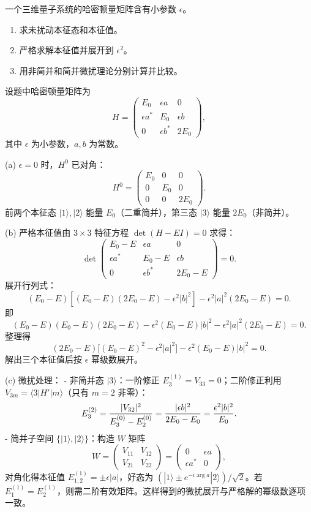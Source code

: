\begin{question}
一个三维量子系统的哈密顿量矩阵含有小参数 $\epsilon$。
\begin{enumerate}
\item 求未扰动本征态和本征值。
\item 严格求解本征值并展开到 $\epsilon^2$。
\item 用非简并和简并微扰理论分别计算并比较。
\end{enumerate}
\end{question}
\begin{solution}
设题中哈密顿量矩阵为
\[
H=\begin{pmatrix}
E_0 & \epsilon a & 0\\
\epsilon a^* & E_0 & \epsilon b\\
0 & \epsilon b^* & 2E_0
\end{pmatrix},
\]
其中 $\epsilon$ 为小参数，$a,b$ 为常数。

(a) $\epsilon=0$ 时，$H^0$ 已对角：
\[
H^0=\begin{pmatrix}
E_0 & 0 & 0\\
0 & E_0 & 0\\
0 & 0 & 2E_0
\end{pmatrix}.
\]
前两个本征态 $|1\rangle,|2\rangle$ 能量 $E_0$（二重简并），第三态 $|3\rangle$ 能量 $2E_0$（非简并）。

(b) 严格本征值由 $3\times3$ 特征方程 $\det(H-EI)=0$ 求得：
\[
\det\begin{pmatrix}
E_0-E & \epsilon a & 0\\
\epsilon a^* & E_0-E & \epsilon b\\
0 & \epsilon b^* & 2E_0-E
\end{pmatrix}=0.
\]
展开行列式：
\[
(E_0-E)[(E_0-E)(2E_0-E)-\epsilon^2|b|^2]-\epsilon^2|a|^2(2E_0-E)=0.
\]
即
\[
(E_0-E)(E_0-E)(2E_0-E)-\epsilon^2(E_0-E)|b|^2-\epsilon^2|a|^2(2E_0-E)=0.
\]
整理得
\[
(2E_0-E)\bigl[(E_0-E)^2-\epsilon^2|a|^2\bigr]-\epsilon^2(E_0-E)|b|^2=0.
\]
解出三个本征值后按 $\epsilon$ 幂级数展开。

(c) 微扰处理：
- 非简并态 $|3\rangle$：一阶修正 $E_3^{(1)}=V_{33}=0$；二阶修正利用 $V_{3m}=\langle3|H'|m\rangle$（只有 $m=2$ 非零）：
\[
E_3^{(2)}={|V_{32}|^2\over E_3^{(0)}-E_2^{(0)}}
={|\epsilon b|^2\over 2E_0-E_0}={\epsilon^2|b|^2\over E_0}.
\]
- 简并子空间 $\{|1\rangle,|2\rangle\}$：构造 $W$ 矩阵
\[
W=\begin{pmatrix}
V_{11} & V_{12}\\
V_{21} & V_{22}
\end{pmatrix}
=\begin{pmatrix}
0 & \epsilon a\\
\epsilon a^* & 0
\end{pmatrix},
\]
对角化得本征值 $E_{1,2}^{(1)}=\pm\epsilon|a|$，好态为 $(|1\rangle\pm e^{-i\arg a}|2\rangle)/\sqrt2$。若 $E_1^{(1)}=E_2^{(1)}$，则需二阶有效矩阵。这样得到的微扰展开与严格解的幂级数逐项一致。
\end{solution}

